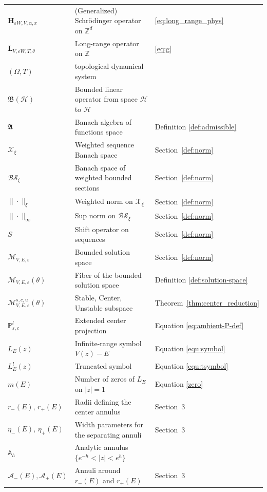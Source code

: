 \documentclass[reqno,11pt]{amsart}
\newcommand{\Z}{{\mathbb Z}}
\begin{document}
\begin{longtable}{
    >{\raggedright\arraybackslash}p{}
    >{\raggedright\arraybackslash}p{}
    >{\raggedright\arraybackslash}p{}
}
$\mathbf{H}_{\varepsilon W,V,\alpha,x}$ & (Generalized) Schr\"odinger operator on $\Z^d$ & \eqref{eq:long_range_phys} \\
$\mathbf{L}_{V,\varepsilon W,T,\theta}$ & Long-range operator on $\Z$ &  \eqref{eq:g}\\
$(\Omega,T)$ & topological dynamical system  \\
$\mathfrak{B}(\mathcal{H})$ & Bounded linear operator from space $\mathcal{H}$ to $\mathcal{H}$ & \\
$\mathfrak A$ & Banach algebra of functions space & Definition \ref{def:admissible} \\
$\mathcal{X}_{\xi}$ & Weighted sequence Banach space & Section~\ref{def:norm} \\
$\mathcal{BS_\xi}$ & Banach space of weighted bounded sections & Section~\ref{def:norm} \\
$\|\cdot\|_\xi$ & Weighted norm on $\mathcal{X}_{\xi}$ & Section~\ref{def:norm} \\
$\|\cdot\|_\infty$ & Sup norm on $\mathcal{BS_\xi}$ & Section~\ref{def:norm} \\
$S$ & Shift operator on sequences & Section~\ref{def:norm} \\
$\boldsymbol{\mathcal M}_{V,E,\varepsilon}$ & Bounded solution space  & Section~\ref{def:norm} \\
$\mathcal M_{V,E,\varepsilon}(\theta)$ & Fiber of the bounded solution space & Definition \ref{def:solution-space} \\
$\mathcal M^{s,c,u}_{V,E,\varepsilon}(\theta)$ & Stable, Center, Unstable subspace & Theorem~\ref{thm:center_reduction} \\
$\mathbb{P}^{l}_{\varepsilon,c}$ & Extended center projection  & Equation \eqref{eq:ambient-P-def} \\
$L_{E}(z)$ & Infinite-range symbol $V(z)-E$ & Equation \eqref{equ:symbol} \\
$L_E^{l}(z)$ & Truncated symbol & Equation \eqref{equ:tsymbol} \\
$m(E)$ & Number of zeros of $L_{E}$ on $|z|=1$ & Equation \eqref{zero} \\
$r_-(E),\,r_+(E)$ & Radii defining the center annulus & Section~3 \\
$\eta_-(E),\,\eta_+(E)$ & Width parameters for the separating annuli & Section~3 \\
$\mathbb A_h$ & Analytic annulus $\{e^{-h}<|z|<e^h\}$ & \\
$\mathcal A_-(E),\mathcal A_+(E)$ & Annuli around $r_-(E)$ and $r_+(E)$ & Section~3 \\

\end{longtable}
\end{document}
